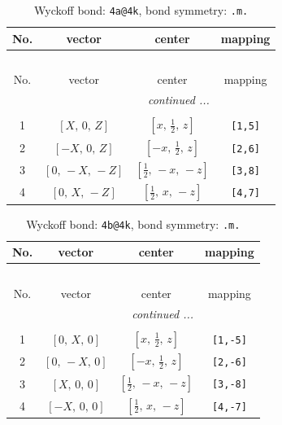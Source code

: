 \documentclass[fleqn,8pt]{jsarticle}
\begin{document}
\begin{longtable}{cccc}
\caption{Wyckoff bond: {\tt 4a@4k}, bond symmetry: {\tt .m.}}
 \\
 \hline \hline
No. & vector & center & mapping \\ \hline \endfirsthead

\multicolumn{3}{l}{\tablename\ \thetable{}} \\
 \hline \hline
No. & vector & center & mapping \\ \hline \endhead

 \hline \hline
\multicolumn{3}{r}{\footnotesize\it continued ...} \\ \endfoot

 \hline \hline
\multicolumn{3}{r}{} \\ \endlastfoot

1 & $\left[ X,\, 0,\, Z \right]$ & $\left[ x,\, \frac{1}{2},\, z \right]$ & {\tt [1,5]} \\ \hline
2 & $\left[ - X,\, 0,\, Z \right]$ & $\left[ - x,\, \frac{1}{2},\, z \right]$ & {\tt [2,6]} \\ \hline
3 & $\left[ 0,\, - X,\, - Z \right]$ & $\left[ \frac{1}{2},\, - x,\, - z \right]$ & {\tt [3,8]} \\ \hline
4 & $\left[ 0,\, X,\, - Z \right]$ & $\left[ \frac{1}{2},\, x,\, - z \right]$ & {\tt [4,7]} \\
\end{longtable}
\renewcommand{\arraystretch}{1.2}
\begin{longtable}{cccc}
\caption{Wyckoff bond: {\tt 4b@4k}, bond symmetry: {\tt .m.}}
 \\
 \hline \hline
No. & vector & center & mapping \\ \hline \endfirsthead

\multicolumn{3}{l}{\tablename\ \thetable{}} \\
 \hline \hline
No. & vector & center & mapping \\ \hline \endhead

 \hline \hline
\multicolumn{3}{r}{\footnotesize\it continued ...} \\ \endfoot

 \hline \hline
\multicolumn{3}{r}{} \\ \endlastfoot

1 & $\left[ 0,\, X,\, 0 \right]$ & $\left[ x,\, \frac{1}{2},\, z \right]$ & {\tt [1,-5]} \\ \hline
2 & $\left[ 0,\, - X,\, 0 \right]$ & $\left[ - x,\, \frac{1}{2},\, z \right]$ & {\tt [2,-6]} \\ \hline
3 & $\left[ X,\, 0,\, 0 \right]$ & $\left[ \frac{1}{2},\, - x,\, - z \right]$ & {\tt [3,-8]} \\ \hline
4 & $\left[ - X,\, 0,\, 0 \right]$ & $\left[ \frac{1}{2},\, x,\, - z \right]$ & {\tt [4,-7]} \\
\end{longtable}
\end{document}
